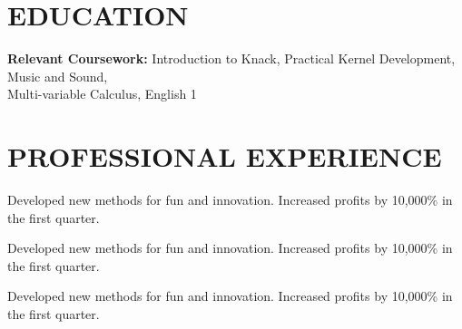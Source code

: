 \documentclass{res}
\begin{document}
\address{\bf CONTACT INFORMATION \\ email@example.com \\ (555) 555-1234}
\address{\bf ADDRESS \\ 1 Fake St \\ City, State 12345}

\begin{resume}

\section{EDUCATION}


    \begin{position}
    \textbf{Relevant Coursework:}
    Introduction to Knack, Practical Kernel Development, Music and Sound,\\
    Multi-variable Calculus, English 1
    \end{position}

\section{PROFESSIONAL EXPERIENCE}


    \begin{position}
        Developed new methods for fun and innovation. Increased profits by
        10,000\% in the first quarter.
    \end{position}

    \begin{position}
        Developed new methods for fun and innovation. Increased profits by
        10,000\% in the first quarter.
    \end{position}

    \begin{position}
        Developed new methods for fun and innovation. Increased profits by
        10,000\% in the first quarter.
    \end{position}


\end{resume}
\end{document}
